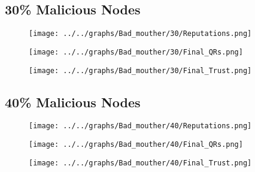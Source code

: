 \begin{minipage}[t]{0.49\columnwidth}
\subsection*{30\% Malicious Nodes}
    \begin{figure}[H]
        \centering
        \texttt{[image: ../../graphs/Bad\_mouther/30/Reputations.png]}
    \end{figure}
    \begin{figure}[H]
        \centering
        \texttt{[image: ../../graphs/Bad\_mouther/30/Final\_QRs.png]}
    \end{figure}
\end{minipage}
\begin{minipage}[t]{0.49\columnwidth}
    \begin{figure}[H]
        \centering
        \texttt{[image: ../../graphs/Bad\_mouther/30/Final\_Trust.png]}
    \end{figure}
\end{minipage}

\begin{minipage}[t]{0.49\columnwidth}
\subsection*{40\% Malicious Nodes}
    \begin{figure}[H]
        \centering
        \texttt{[image: ../../graphs/Bad\_mouther/40/Reputations.png]}
    \end{figure}
    \begin{figure}[H]
        \centering
        \texttt{[image: ../../graphs/Bad\_mouther/40/Final\_QRs.png]}
    \end{figure}
\end{minipage}
\begin{minipage}[t]{0.49\columnwidth}
    \begin{figure}[H]
        \centering
        \texttt{[image: ../../graphs/Bad\_mouther/40/Final\_Trust.png]}
    \end{figure}
\end{minipage}

